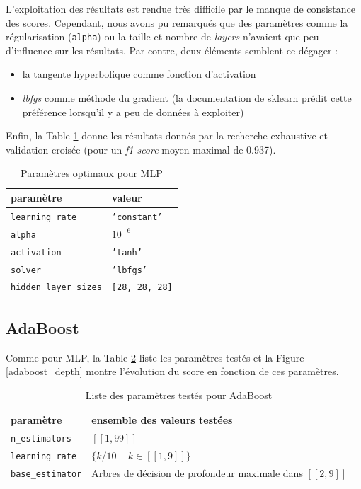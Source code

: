\documentclass[a4paper]{report}
\begin{document}
L'exploitation des résultats est rendue très difficile par le manque de consistance des scores. Cependant, nous avons pu remarqués que des paramètres comme la régularisation (\texttt{alpha}) ou la taille et nombre de \emph{layers} n'avaient que peu d'influence sur les résultats. Par contre, deux éléments semblent ce dégager : \begin{itemize}
\item la tangente hyperbolique comme fonction d'activation
\item \emph{lbfgs} comme méthode du gradient (la documentation de sklearn prédit cette préférence lorsqu'il y a peu de données à exploiter)
\end{itemize}
Enfin, la Table \ref{best_params_mlp} donne les résultats donnés par la recherche exhaustive et validation croisée (pour un \emph{f1-score} moyen maximal de 0.937).

\begin{table}
\centering
\begin{tabular}{ll}
paramètre & valeur \\
\hline
\texttt{learning\_rate} & \texttt{'constant'} \\
\texttt{alpha} & \texttt{$10^{-6}$} \\
\texttt{activation} & \texttt{'tanh'} \\
\texttt{solver} & \texttt{'lbfgs'} \\
\texttt{hidden\_layer\_sizes} & \texttt{[28, 28, 28]}\\
\end{tabular}
\caption{Paramètres optimaux pour MLP\label{best_params_mlp}}
\end{table}


\subsection{AdaBoost}

Comme pour MLP, la Table \ref{params_ada} liste les paramètres testés et la Figure \ref{adaboost_depth} montre l'évolution du score en fonction de ces paramètres.

\begin{table}
\centering
\begin{tabular}{ll}
paramètre & ensemble des valeurs testées \\
\hline
\texttt{n\_estimators} & $[\![1, 99]\!]$ \\
\texttt{learning\_rate} & $\{k/10 \>\> | \>\> k \in [\![1, 9]\!] \}$ \\
\texttt{base\_estimator} & Arbres de décision de profondeur maximale dans $[\![2, 9]\!]$\\
\end{tabular}
\caption{Liste des paramètres testés pour AdaBoost\label{params_ada}}
\end{table}
\end{document}
